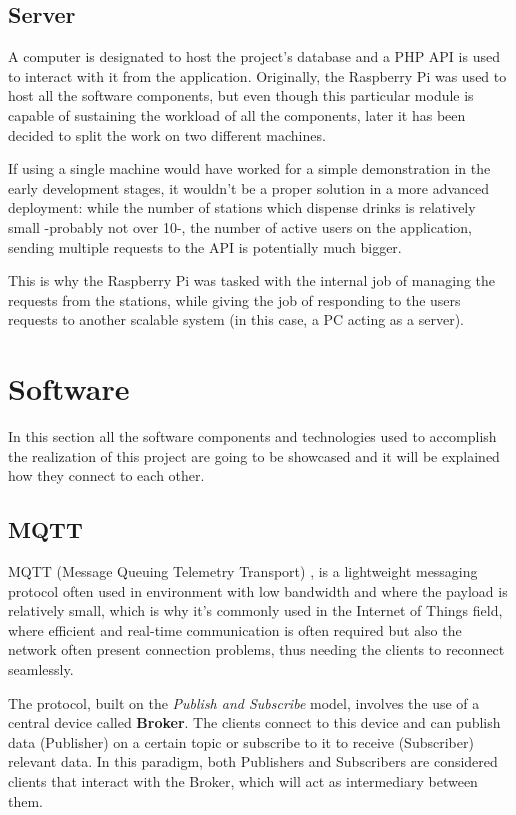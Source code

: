 \documentclass[target=bach,aauheader=,style=]{thud}
\begin{document}
\subsection{Server}

A computer is designated to host the project's database and a PHP API is used to interact with it from the application.
Originally, the Raspberry Pi was used to host all the software components, but even though this particular module is capable of sustaining the workload of all the components, later it has been decided to split the work on two different machines.

If using a single machine would have worked for a simple demonstration in the early development stages, it wouldn't be a proper solution in a more advanced deployment: while the number of stations which dispense drinks is relatively small -probably not over 10-, the number of active users on the application, sending multiple requests to the API is potentially much bigger.

This is why the Raspberry Pi was tasked with the internal job of managing the requests from the stations, while giving the job of responding to the users requests to another scalable system (in this case, a PC acting as a server).
\newpage

\section{Software}

In this section all the software components and technologies used to accomplish the realization of this project are going to be showcased and it will be explained how they connect to each other.

\subsection{MQTT}
MQTT (Message Queuing Telemetry Transport) \cite{mqtt}, is a lightweight messaging protocol often used in environment with low bandwidth and where the payload is relatively small, which is why it's commonly used in the Internet of Things field, where efficient and real-time communication is often required but also the network often present connection problems, thus needing the clients to reconnect seamlessly.

The protocol, built on the \emph{Publish and Subscribe} model, involves the use of a central device called \textbf{Broker}. The clients connect to this device and can publish data (Publisher) on a certain topic or subscribe to it to receive (Subscriber) relevant data. In this paradigm, both Publishers and Subscribers are considered clients that interact with the Broker, which will act as intermediary between them.
\end{document}
